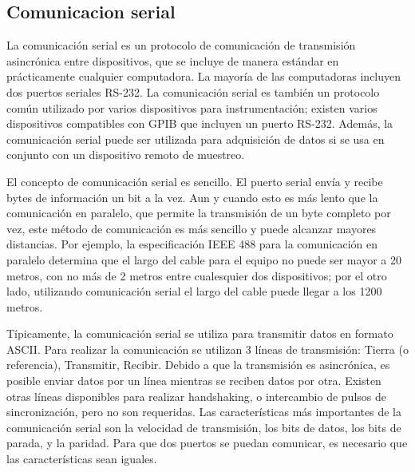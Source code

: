 
\subsection{Comunicacion serial} %
\label{sub:comunicacion_serial}

La comunicación serial es un protocolo de comunicación de transmisión asincrónica entre dispositivos, que se incluye de manera estándar en prácticamente cualquier computadora. La mayoría de las computadoras incluyen dos puertos seriales RS-232. La comunicación serial es también un protocolo común utilizado por varios dispositivos para instrumentación; existen varios dispositivos compatibles con GPIB que incluyen un puerto RS-232. Además, la comunicación serial puede ser utilizada para adquisición de datos si se usa en conjunto con un dispositivo remoto de muestreo.

El concepto de comunicación serial es sencillo. El puerto serial envía y recibe bytes de información un bit a la vez. Aun y cuando esto es más lento que la comunicación en paralelo, que permite la transmisión de un byte completo por vez, este método de comunicación es más sencillo y puede alcanzar mayores distancias. Por ejemplo, la especificación IEEE 488 para la comunicación en paralelo determina que el largo del cable para el equipo no puede ser mayor a 20 metros, con no más de 2 metros entre cualesquier dos dispositivos; por el otro lado, utilizando comunicación serial el largo del cable puede llegar a los 1200 metros.

Típicamente, la comunicación serial se utiliza para transmitir datos en formato ASCII. Para realizar la comunicación se utilizan 3 líneas de transmisión: Tierra (o referencia), Transmitir, Recibir. Debido a que la transmisión es asincrónica, es posible enviar datos por un línea mientras se reciben datos por otra. Existen otras líneas disponibles para realizar handshaking, o intercambio de pulsos de sincronización, pero no son requeridas. Las características más importantes de la comunicación serial son la velocidad de transmisión, los bits de datos, los bits de parada, y la paridad. Para que dos puertos se puedan comunicar, es necesario que las características sean iguales.\cite{intro_serial}

